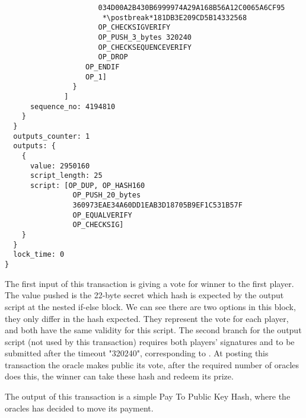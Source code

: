 \begin{lstlisting}
                      034D00A2B430B6999974A29A168B56A12C0065A6CF95
                       *\postbreak*181DB3E209CD5B14332568
                      OP_CHECKSIGVERIFY
                      OP_PUSH_3_bytes 320240
                      OP_CHECKSEQUENCEVERIFY
                      OP_DROP
                   OP_ENDIF
                   OP_1]
                }
              ]
      sequence_no: 4194810
    }
  }
  outputs_counter: 1
  outputs: {
    {
      value: 2950160
      script_length: 25
      script: [OP_DUP, OP_HASH160
                OP_PUSH_20_bytes
                360973EAE34A60DD1EAB3D18705B9EF1C531B57F
                OP_EQUALVERIFY
                OP_CHECKSIG]
    }
  }
  lock_time: 0
}
\end{lstlisting}

The first input of this transaction is giving a vote for winner to the first
  player.
The value pushed is the 22-byte secret which hash is expected by the
  output script at the nested if-else block.
We can see there are two options in this block, they only differ in the hash
  expected.
They represent the vote for each player, and both have the same validity for
  this script.
The second branch for the output script (not used by this transaction) requires
  both players' signatures and to be submitted after the timeout "320240",
  corresponding to .
At posting this transaction the oracle makes public its vote, after the
  required number of oracles does this, the winner can take these hash and
  redeem its prize.

The output of this transaction is a simple Pay To Public Key Hash, where the
  oracles has decided to move its payment.

